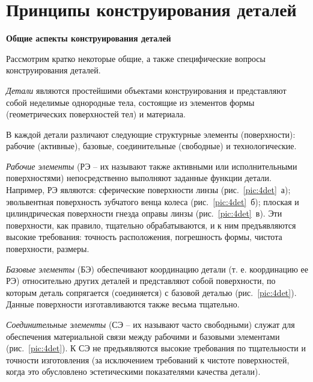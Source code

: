 
\section{Принципы конструирования деталей}

\begin{flushleft}
	\textbf{Общие аспекты конструирования деталей}
\end{flushleft}

Рассмотрим кратко некоторые общие, а также специфические вопросы конструирования деталей. 

\textit{Детали} являются простейшими объектами конструирования и представляют собой неделимые однородные тела, состоящие из элементов формы (геометрических поверхностей тел) и материала.

В каждой детали различают следующие структурные элементы (поверхности): рабочие (активные), базовые, соединительные (свободные) и технологические.

\textit{Рабочие элементы} (РЭ -- их называют также активными или исполнительными поверхностями) непосредственно выполняют заданные функции детали. Например, РЭ являются: сферические поверхности линзы (рис.~\ref{pic:4det}~а); эвольвентная поверхность зубчатого венца колеса (рис.~\ref{pic:4det}~б); плоская и цилиндрическая поверхности гнезда оправы линзы (рис.~\ref{pic:4det}~в). Эти поверхности, как правило, тщательно обрабатываются, и к ним предъявляются высокие требования: точность расположения, погрешность формы, чистота поверхности, размеры.

\textit{Базовые элементы} (БЭ) обеспечивают координацию детали (т. е. координацию ее РЭ) относительно других деталей и представляют собой поверхности, по которым деталь сопрягается (соединяется) с базовой деталью (рис.~\ref{pic:4det}). Данные поверхности изготавливаются также весьма тщательно.

\textit{Соединительные элементы} (СЭ -- их называют часто свободными) служат для обеспечения материальной связи между рабочими и базовыми элементами (рис.~\ref{pic:4det}). К СЭ не предъявляются высокие требования по тщательности и точности изготовления (за исключением требований к чистоте поверхностей, когда это обусловлено эстетическими показателями качества детали).

